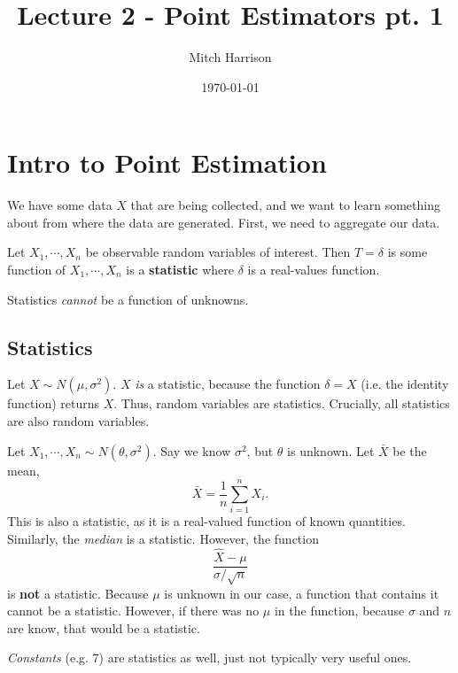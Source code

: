 \documentclass[titlepage, 12pt, leqno]{article}
\title{\Huge{Lecture 2 - Point Estimators pt. 1}}
\author{\large{Mitch Harrison}}
\date{\today}
\begin{document}
\setlength{\parskip}{1\baselineskip}
\setlength{\parindent}{15pt}
\maketitle
\tableofcontents
\newpage


\section{Intro to Point Estimation}

We have some data $X$ that are being collected, and we want to learn something
about from where the data are generated. First, we need to aggregate our data.

\begin{definition}
    Let $X_{1}, \cdots , X_{n}$ be observable random variables of interest. Then
    $T = \delta$ is some function of $X_{1}, \cdots , X_{n}$ is a
    \textbf{statistic} where $\delta$ is a real-values function.
    \begin{note}
        Statistics \textit{cannot} be a function of unknowns.
    \end{note}
\end{definition}

\subsection{Statistics}
Let $X \sim N(\mu, \sigma^{2})$. $X$ \textit{is} a statistic, because the
function $\delta = X$ (i.e. the identity function) returns $X$. Thus, random
variables are statistics. Crucially, all statistics are also random variables.

Let $X_{1}, \cdots , X_{n} \sim N(\theta, \sigma^{2})$. Say we know $\sigma^{2}$,
but $\theta$ is unknown. Let $\bar X$ be the mean,
\[
\bar X = \frac{1}{n}\sum_{i=1}^{n}X_{i}.
\]
This is also a statistic, as it is a real-valued function of known quantities.
Similarly, the \textit{median} is a statistic. However, the function
\[
\frac{\hat X - \mu}{\sigma / \sqrt{n}}
\]
is \textbf{not} a statistic. Because $\mu$ is unknown in our case, a function
that contains it cannot be a statistic. However, if there was no $\mu$ in the
function, because $\sigma$ and $n$ are know, that would be a statistic. 
\begin{note}
    \textit{Constants} (e.g. 7) are statistics as well, just not typically very
    useful ones.
\end{note}
\end{document}

